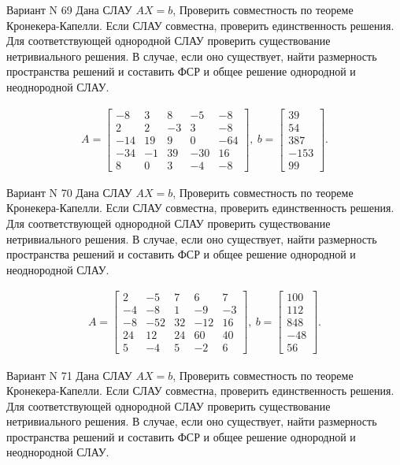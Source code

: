 \documentclass[11pt]{report}
\begin{document}
Вариант N 69
Дана СЛАУ $AX = b$,
Проверить совместность по теореме Кронекера-Капелли. Если СЛАУ совместна, проверить единственность решения.
Для соответствующей однородной СЛАУ проверить существование нетривиального решения. В случае, если оно существует,
найти размерность пространства решений и составить ФСР и общее решение однородной  и неоднородной СЛАУ.


\begin{align*}
 A = \left[\begin{matrix}-8 & 3 & 8 & -5 & -8\\2 & 2 & -3 & 3 & -8\\-14 & 19 & 9 & 0 & -64\\-34 & -1 & 39 & -30 & 16\\8 & 0 & 3 & -4 & -8\end{matrix}\right],
\ b = \left[\begin{matrix}39\\54\\387\\-153\\99\end{matrix}\right]. 
 \end{align*}

Вариант N 70
Дана СЛАУ $AX = b$,
Проверить совместность по теореме Кронекера-Капелли. Если СЛАУ совместна, проверить единственность решения.
Для соответствующей однородной СЛАУ проверить существование нетривиального решения. В случае, если оно существует,
найти размерность пространства решений и составить ФСР и общее решение однородной  и неоднородной СЛАУ.


\begin{align*}
 A = \left[\begin{matrix}2 & -5 & 7 & 6 & 7\\-4 & -8 & 1 & -9 & -3\\-8 & -52 & 32 & -12 & 16\\24 & 12 & 24 & 60 & 40\\5 & -4 & 5 & -2 & 6\end{matrix}\right],
\ b = \left[\begin{matrix}100\\112\\848\\-48\\56\end{matrix}\right]. 
 \end{align*}

Вариант N 71
Дана СЛАУ $AX = b$,
Проверить совместность по теореме Кронекера-Капелли. Если СЛАУ совместна, проверить единственность решения.
Для соответствующей однородной СЛАУ проверить существование нетривиального решения. В случае, если оно существует,
найти размерность пространства решений и составить ФСР и общее решение однородной  и неоднородной СЛАУ.
\end{document}
